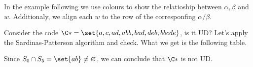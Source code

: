 \documentclass{subfiles}
\begin{document}
    In the example following we use colours to show the relatioship between \(\alpha, \beta\)
    and \(w\). Additionaly, we align each \(w\) to the row of the corresponfing \(\alpha/\beta\).
    \clearpage 

    \begin{example*}
        Consider the code \(\C* = \set{a, c, ad, abb, bad, deb, bbcde}\), is it UD?
            Let's apply the Sardinas-Patterson algorithm and check. 
            What we get is the following table.

            

            \noindent Since \(S_{0} \cap S_{5} = \set{ab} \ne \varnothing\),
            we can conclude that \(\C*\) is not UD.
    \end{example*}
\end{document}
